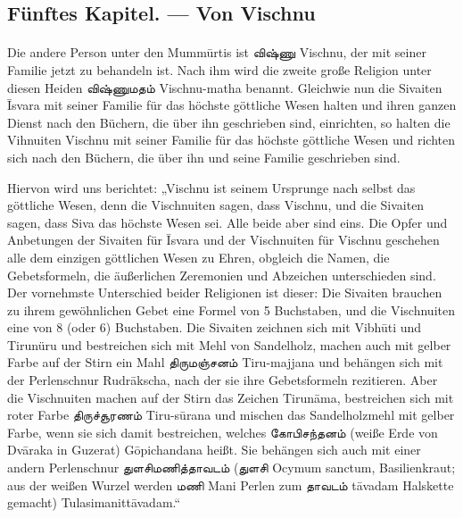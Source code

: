 \documentclass{article}
\newcommand{\TamilText}[1]{\texttamil{#1}}
\newcommand{\tam}[1]{\TamilText{#1}}
\begin{document}
\clearpage
\subsection{Fünftes Kapitel. — Von Vischnu}
\paragraph{}
Die andere Person unter den Mumm\={u}rtis ist \tam{விஷ்ணு} Vischnu, der mit seiner Familie jetzt zu behandeln ist. Nach ihm wird die zweite große Religion unter diesen Heiden \tam{விஷ்ணுமதம்} Vischnu-matha benannt. Gleichwie nun die Sivaiten \={I}svara mit seiner Familie für das höchste göttliche Wesen halten und ihren ganzen Dienst nach den Büchern, die über ihn geschrieben sind, einrichten, so halten die Vihnuiten Vischnu mit seiner Familie für das höchste göttliche Wesen und richten sich nach den Büchern, die über ihn und seine Familie geschrieben sind.

Hiervon wird uns berichtet: „Vischnu ist seinem Ursprunge nach selbst das göttliche Wesen, denn die Vischnuiten sagen, dass Vischnu, und die Sivaiten sagen, dass Siva das höchste Wesen sei. Alle beide aber sind eins. Die Opfer und Anbetungen der Sivaiten für \={I}svara und der Vischnuiten für Vischnu geschehen alle dem einzigen göttlichen Wesen zu Ehren, obgleich die Namen, die Gebetsformeln, die äußerlichen Zeremonien und Abzeichen unterschieden sind. Der vornehmste Unterschied beider Religionen ist dieser: Die Sivaiten brauchen zu ihrem gewöhnlichen Gebet eine Formel von 5 Buchstaben, und die Vischnuiten eine von 8 (oder 6) Buchstaben. Die Sivaiten zeichnen sich mit Vibh\={u}ti und Tirunüru und bestreichen sich mit Mehl von Sandelholz, machen auch mit gelber Farbe auf der Stirn ein Mahl \tam{திருமஞ்சனம்} Tiru-majjana und behängen sich mit der Perlenschnur Rudr\={a}kscha, nach der sie ihre Gebetsformeln rezitieren. Aber die Vischnuiten machen auf der Stirn das Zeichen Tirun\={a}ma, bestreichen sich mit roter Farbe \tam{திருச்சூரணம்} Tiru-s\={u}rana und mischen das Sandelholzmehl mit gelber Farbe, wenn sie sich damit bestreichen, welches \tam{கோபிசந்தனம்} (weiße Erde von Dv\={a}raka in Guzerat) G\={o}pichandana heißt. Sie behängen sich auch mit einer andern Perlenschnur \tam{துளசிமணித்தாவடம்} (\tam{துளசி} Ocymum sanctum, Basilienkraut; aus der weißen Wurzel werden \tam{மணி} Mani Perlen zum \tam{தாவடம்} t\={a}vadam Halskette gemacht) Tulasimanitt\={a}vadam.“
\end{document}
